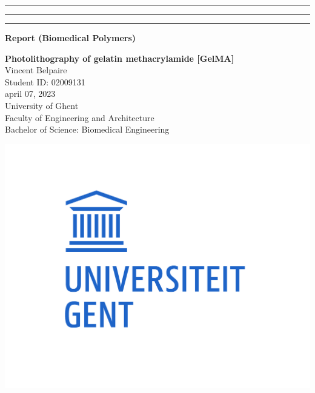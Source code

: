 {\color{ugent_blue} \hrule\hrule\hrule}

\vspace*{-0.43mm}
\colorbox{ugent_blue}{\color{white} \bf Report (Biomedical Polymers)}\\

\noindent\begin{minipage}{0.7\textwidth}%
{\LARGE \bf \color{ugent_blue} Photolithography of gelatin methacrylamide [GelMA]}\\[2mm]

%
{\large Vincent Belpaire}\\
{Student ID: 02009131}\\
april 07, 2023\\


{\small University of Ghent}\\
{\small Faculty of Engineering and Architecture}\\
{\small Bachelor of Science: Biomedical Engineering}\\
\end{minipage}%
\hfill%
\begin{minipage}{0.3\textwidth}
\vspace{-2.2cm}
\begin{center}
\includegraphics[width=\linewidth]{ugent_logo}
\end{center}
\end{minipage}\\